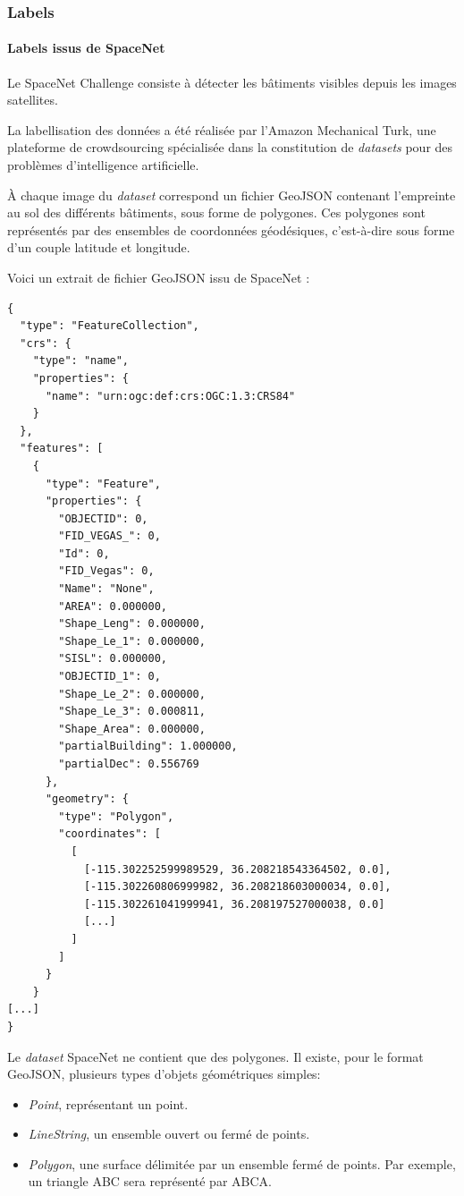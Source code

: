 \documentclass[a4paper, 11pt]{report}
\begin{document}
\subsubsection{Labels}
\paragraph{Labels issus de SpaceNet}
Le SpaceNet Challenge consiste à détecter les bâtiments visibles depuis les images satellites.

La labellisation des données a été réalisée par l'Amazon Mechanical Turk, une plateforme de crowdsourcing spécialisée dans la constitution de \emph{datasets} pour des problèmes d'intelligence artificielle.

À chaque image du \emph{dataset} correspond un fichier GeoJSON contenant l'empreinte au sol des différents bâtiments, sous forme de polygones.
Ces polygones sont représentés par des ensembles de coordonnées géodésiques, c'est-à-dire sous forme d'un couple latitude et longitude.

Voici un extrait de fichier GeoJSON issu de SpaceNet :
\begin{verbatim}
{
  "type": "FeatureCollection",
  "crs": {
    "type": "name",
    "properties": {
      "name": "urn:ogc:def:crs:OGC:1.3:CRS84"
    }
  },
  "features": [
    {
      "type": "Feature",
      "properties": {
        "OBJECTID": 0,
        "FID_VEGAS_": 0,
        "Id": 0,
        "FID_Vegas": 0,
        "Name": "None",
        "AREA": 0.000000,
        "Shape_Leng": 0.000000,
        "Shape_Le_1": 0.000000,
        "SISL": 0.000000,
        "OBJECTID_1": 0,
        "Shape_Le_2": 0.000000,
        "Shape_Le_3": 0.000811,
        "Shape_Area": 0.000000,
        "partialBuilding": 1.000000,
        "partialDec": 0.556769
      },
      "geometry": {
        "type": "Polygon",
        "coordinates": [
          [
            [-115.302252599989529, 36.208218543364502, 0.0],
            [-115.302260806999982, 36.208218603000034, 0.0], 
            [-115.302261041999941, 36.208197527000038, 0.0]
            [...]
          ]
        ]
      }
    }
[...]
}
\end{verbatim}
Le \emph{dataset} SpaceNet ne contient que des polygones.
Il existe, pour le format GeoJSON, plusieurs types d'objets géométriques simples:
\begin{itemize}
	\item \emph{Point}, représentant un point.
	\item \emph{LineString}, un ensemble ouvert ou fermé de points.
	\item \emph{Polygon}, une surface délimitée par un ensemble fermé de points. Par exemple, un triangle ABC sera représenté par ABCA.
\end{itemize}
\end{document}
